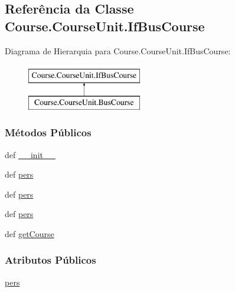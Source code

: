 \hypertarget{classCourse_1_1CourseUnit_1_1IfBusCourse}{\subsection{Referência da Classe Course.\-Course\-Unit.\-If\-Bus\-Course}
\label{classCourse_1_1CourseUnit_1_1IfBusCourse}
}
Diagrama de Hierarquia para Course.\-Course\-Unit.\-If\-Bus\-Course\-:\begin{figure}[H]
\begin{center}
\leavevmode
\includegraphics[height=2.000000cm]{d0/d28/classCourse_1_1CourseUnit_1_1IfBusCourse}
\end{center}
\end{figure}
\subsubsection*{Métodos Públicos}
\begin{DoxyCompactItemize}
\item 
def \hyperlink{classCourse_1_1CourseUnit_1_1IfBusCourse_ad2920d0a7dcd1838f1220f644e8244e5}{\-\_\-\-\_\-init\-\_\-\-\_\-}
\item 
def \hyperlink{classCourse_1_1CourseUnit_1_1IfBusCourse_adf5702dec1a99bbb31936b7f1d425a40}{pers}
\item 
def \hyperlink{classCourse_1_1CourseUnit_1_1IfBusCourse_adf5702dec1a99bbb31936b7f1d425a40}{pers}
\item 
def \hyperlink{classCourse_1_1CourseUnit_1_1IfBusCourse_adf5702dec1a99bbb31936b7f1d425a40}{pers}
\item 
def \hyperlink{classCourse_1_1CourseUnit_1_1IfBusCourse_a26af1b8d56c117b45a9ef3d1dcfbd3a9}{get\-Course}
\end{DoxyCompactItemize}
\subsubsection*{Atributos Públicos}
\begin{DoxyCompactItemize}
\item 
\hyperlink{classCourse_1_1CourseUnit_1_1IfBusCourse_ab926ae8fb127b7697e2b63025df09a78}{pers}
\end{DoxyCompactItemize}


